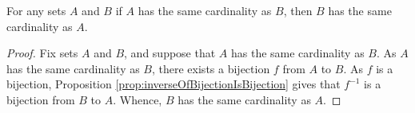 \guard




\begin{prop}
\label{prop:cardinalityIsSymmetric}
  For any sets $A$ and $B$ if $A$ has the same cardinality as $B$, then $B$ has the same cardinality as $A$.
\end{prop}
\begin{proof}
  Fix sets $A$ and $B$, and suppose that $A$ has the same cardinality as $B$.
  As $A$ has the same cardinality as $B$, there exists a bijection $f$ from $A$ to $B$.
  As $f$ is a bijection, Proposition \ref{prop:inverseOfBijectionIsBijection} gives that $f^{-1}$ is a bijection from $B$ to $A$.
  Whence, $B$ has the same cardinality as $A$.
\end{proof}
